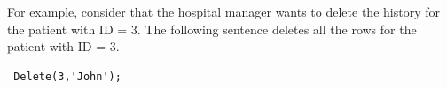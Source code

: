 For example, consider that the hospital manager wants to delete the history for the patient with ID = 3. The following sentence deletes all the rows for the patient with ID = 3.

\begin{verbatim}
 Delete(3,'John');
\end{verbatim}


% 
% 
% 
